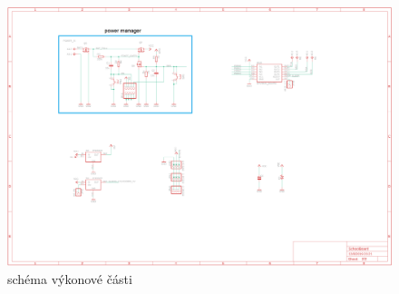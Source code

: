 \documentclass{template/socthesis}
\begin{document}
\begin{figure}[h]
	\centering
	\includegraphics[width=1.5\textwidth, angle = 90]{img/silovka.png}
	\caption{schéma výkonové části}
\end{figure}

\newpage
\printbibliography[title=Literatura]


\listoffigures
{}

\listoftables
{}
\renewcommand{\refname}{Další zdroje}
\end{document}
